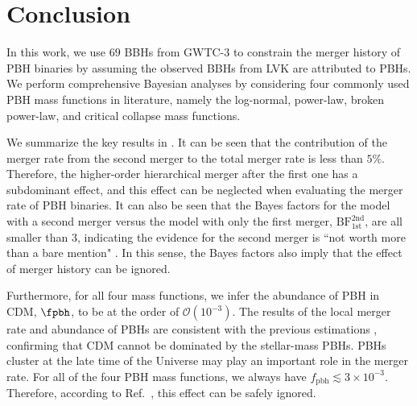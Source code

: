 \documentclass[
reprint,           %
superscriptaddress,%
amsmath,           %
amssymb,           %
aps,               %
prd,               %
notitlepage,       %
longbibliography,  %
floatfix,          %
nofootinbib,
]{revtex4-1}
\begin{document}
\section{\label{conclusion}Conclusion}

In this work, we use $69$ BBHs from GWTC-3 to constrain the merger history of PBH binaries by assuming the observed BBHs from LVK are attributed to PBHs. We perform comprehensive Bayesian analyses by considering four commonly used PBH mass functions in literature, namely the log-normal, power-law, broken power-law, and critical collapse mass functions. 

We summarize the key results in . 
It can be seen that the contribution of the merger rate from the second merger to the total merger rate is less than $5\%$.
Therefore, the higher-order hierarchical merger after the first one has a subdominant effect, and this effect can be neglected when evaluating the merger rate of PBH binaries.
It can also be seen that the Bayes factors for the model with a second merger versus the model with only the first merger, $\mathrm{BF}^{\mathrm{2nd}}_{\mathrm{1st}}$, are all smaller than $3$, indicating the evidence for the second merger is ``not worth more than a bare mention" \cite{BF}. In this sense, the Bayes factors also imply that the effect of merger history can be ignored.

Furthermore, for all four mass functions, we infer the abundance of PBH in CDM, $\fpbh$, to be at the order of $\mathcal{O}(10^{-3})$. The results of the local merger rate and abundance of PBHs are consistent with the previous estimations \cite{Sasaki:2016jop,Ali-Haimoud:2017rtz,Chen:2018czv,Chen:2018rzo,Chen:2019irf,Wu:2020drm,Chen:2021nxo,Chen:2022fda,Zheng:2022wqo}, confirming that CDM cannot be dominated by the stellar-mass PBHs. PBHs cluster at the late time of the Universe may play an important role in the merger rate. For all of the four PBH mass functions, we always have $f_{\mathrm{pbh}} \lesssim 3\times10^{-3}$. Therefore, according to Ref.~\cite{Hutsi:2020sol}, this effect can be safely ignored.
\end{document}
